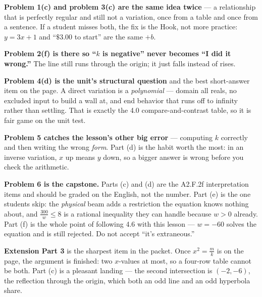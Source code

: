\documentclass[10pt]{article}
\begin{document}
\begin{teachernote}
\textbf{Problem 1(c) and problem 3(c) are the same idea twice} --- a relationship that is perfectly
regular and still not a variation, once from a table and once from a sentence. If a student misses both,
the fix is the Hook, not more practice: $y=3x+1$ and ``$\$3.00$ to start'' are the same $+b$.

\vspace{3pt}
\textbf{Problem 2(f) is there so ``$k$ is negative'' never becomes ``I did it wrong.''} The line still
runs through the origin; it just falls instead of rises.

\vspace{3pt}
\textbf{Problem 4(d) is the unit's structural question} and the best short-answer item on the page. A
direct variation is a \emph{polynomial} --- domain all reals, no excluded input to build a wall at, and
end behavior that runs off to infinity rather than settling. That is exactly the 4.0 compare-and-contrast
table, so it is fair game on the unit test.

\vspace{3pt}
\textbf{Problem 5 catches the lesson's other big error} --- computing $k$ correctly and then writing the
wrong \emph{form}. Part (d) is the habit worth the most: in an inverse variation, $x$ up means $y$ down,
so a bigger answer is wrong before you check the arithmetic.

\vspace{3pt}
\textbf{Problem 6 is the capstone.} Parts (c) and (d) are the A2.F.2f interpretation items and should be
graded on the English, not the number. Part (e) is the one students skip: the \emph{physical} beam adds
a restriction the equation knows nothing about, and $\frac{300}{w}\le8$ is a rational inequality they can
handle because $w>0$ already. Part (f) is the whole point of following 4.6 with this lesson --- $w=-60$
solves the equation and is still rejected. Do not accept ``it's extraneous.''

\vspace{3pt}
\textbf{Extension Part 3} is the sharpest item in the packet. Once $x^2=\frac mk$ is on the page, the
argument is finished: two $x$-values at most, so a four-row table cannot be both. Part (c) is a pleasant
landing --- the second intersection is $(-2,-6)$, the reflection through the origin, which both an odd
line and an odd hyperbola share.
\end{teachernote}
\end{document}
